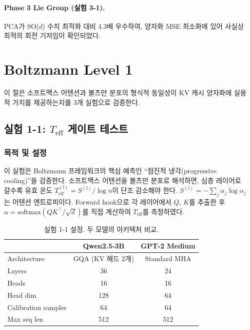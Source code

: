 \documentclass[11pt,a4paper]{article}
\begin{document}
\paragraph{Phase 3 Lie Group (실험 3-1).}
PCA가 SO($d$) 수치 최적화 대비 4.3배 우수하여, 양자화 MSE 최소화에 있어 사실상 최적의 회전 기저임이 확인되었다.

\newpage
\section{Boltzmann Level 1}

이 절은 소프트맥스 어텐션과 볼츠만 분포의 형식적 동일성이 KV 캐시 양자화에 실용적 가치를 제공하는지를 3개 실험으로 검증한다.

\subsection{실험 1-1: $T_\mathrm{eff}$ 게이트 테스트}

\subsubsection{목적 및 설정}

이 실험은 Boltzmann 프레임워크의 핵심 예측인 ``점진적 냉각(progressive cooling)''을 검증한다.
소프트맥스 어텐션을 볼츠만 분포로 해석하면, 심층 레이어로 갈수록 유효 온도 $T_\mathrm{eff}^{(l)} = S^{(l)} / \log n$이 단조 감소해야 한다.
$S^{(l)} = -\sum_j \alpha_j \log \alpha_j$는 어텐션 엔트로피이다.
Forward hook으로 각 레이어에서 $Q$, $K$를 추출한 후 $\alpha = \mathrm{softmax}(QK^\top / \sqrt{d})$를 직접 계산하여 $T_\mathrm{eff}$를 측정하였다.

\begin{table}[H]
\centering
\caption{실험 1-1 설정. 두 모델의 아키텍처 비교.}
\label{tab:exp11_setup}
\begin{tabular}{lcc}
\toprule
\textbf{} & \textbf{Qwen2.5-3B} & \textbf{GPT-2 Medium} \\
\midrule
Architecture & GQA (KV 헤드 2개) & Standard MHA \\
Layers & 36 & 24 \\
Heads & 16 & 16 \\
Head dim & 128 & 64 \\
Calibration samples & 64 & 64 \\
Max seq len & 512 & 512 \\
\bottomrule
\end{tabular}
\end{table}
\end{document}
